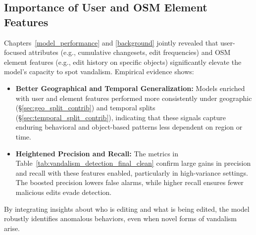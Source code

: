 \documentclass[
    13pt, %
    a4paper, %
    DIV14, %
    listof=totoc, %
    bibliography=totoc, %
    index=totoc, %
    headsepline
]{scrreprt}
\begin{document}
\subsection{Importance of User and OSM Element Features}
Chapters~\ref{model_performance} and \ref{background} jointly revealed that user-focused attributes (e.g., cumulative changesets, edit frequencies) and OSM element features (e.g., edit history on specific objects) significantly elevate the model’s capacity to spot vandalism. Empirical evidence shows:
\begin{itemize}
    \item \textbf{Better Geographical and Temporal Generalization:} Models enriched with user and element features performed more consistently under geographic (\S\ref{sec:geo_split_contrib}) and temporal splits (\S\ref{sec:temporal_split_contrib}), indicating that these signals capture enduring behavioral and object-based patterns less dependent on region or time.
    \item \textbf{Heightened Precision and Recall:} The metrics in Table~\ref{tab:vandalism_detection_final_clean} confirm large gains in precision and recall with these features enabled, particularly in high-variance settings. The boosted precision lowers false alarms, while higher recall ensures fewer malicious edits evade detection.
\end{itemize}
By integrating insights about who is editing and what is being edited, the model robustly identifies anomalous behaviors, even when novel forms of vandalism arise.
\end{document}
